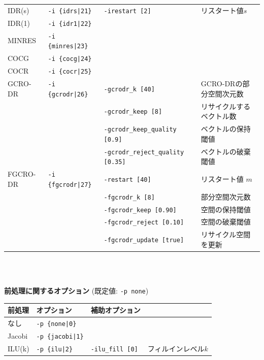 \documentclass[a4paper]{jarticle}
\begin{document}
{{\begin{minipage}[t]{\textwidth}
\begin{center}
\begin{tabular}{l|lll}
 IDR(s)      & \verb=-i {idrs|21}=      & \verb=-irestart [2]= & リスタート値$s$  \\
 IDR(1)      & \verb=-i {idr1|22}=      &    \\
 MINRES      & \verb=-i {minres|23}=    &    \\
 COCG        & \verb=-i {cocg|24}=      &    \\
 COCR        & \verb=-i {cocr|25}=      &    \\   
 GCRO-DR     & \verb=-i {gcrodr|26}=    & \verb=-gcrodr_k [40]= & GCRO-DRの部分空間次元数 \\ 
             &                          & \verb=-gcrodr_keep [8]= & リサイクルするベクトル数 \\ 
 &                          & \verb=-gcrodr_keep_quality [0.9]= & ベクトルの保持閾値 \\
 &                          & \verb=-gcrodr_reject_quality [0.35]= & ベクトルの破棄閾値 \\   
 FGCRO-DR    & \verb=-i {fgcrodr|27}=   & \verb=-restart [40]= & リスタート値 $m$ \\
             &                          & \verb=-fgcrodr_k [8]= & 部分空間次元数 \\
             &                          & \verb=-fgcrodr_keep [0.90]= & 空間の保持閾値 \\
             &                          & \verb=-fgcrodr_reject [0.10]= & 空間の破棄閾値 \\
             &                          & \verb=-fgcrodr_update [true]= & リサイクル空間を更新 \\
 \hline         
\end{tabular}
\end{center}
\end{minipage}
\\ \\
\begin{minipage}[t]{\textwidth}
\begin{center}
{\bf 前処理に関するオプション} (既定値: \verb=-p none=) \\
\begin{tabular}{l|lll}\hline\hline
前処理   & オプション           & 補助オプション \\ \hline
なし     & \verb=-p {none|0}=    &   \\
Jacobi   & \verb=-p {jacobi|1}=  &     \\
ILU(k)   & \verb=-p {ilu|2}=     & \verb=-ilu_fill [0]=    & フィルインレベル$k$ \\

\end{tabular}
\end{center}
\end{minipage}}}
\end{document}
